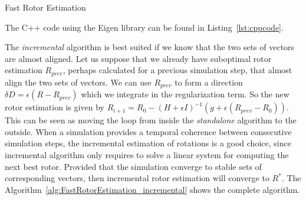 \documentclass{birkjour}
\numberwithin{equation}{section}
\begin{document}
\begin{algorithm}
\begin{algorithmic}[1]
\ENDFOR
{} 
\REPEAT
{}
\end{algorithmic}
\caption{Fast Rotor Estimation}\label{alg:FastRotorEstimation}
\end{algorithm}
The C++ code using the Eigen library can be found in Listing~\ref{lst:cppcode}.

The \emph{incremental} algorithm is best suited if we know that the two sets of vectors are almost aligned. Let us suppose that we already have suboptimal rotor estimation $R_{prev}$, perhaps calculated for a previous simulation step, that almost align the two sets of vectors. We can use $R_{prev}$ to form a direction $\delta D = \epsilon (R - R_{prev})$ which we integrate in the regularization term. So the new rotor estimation is given by $R_{i+1} = R_0 - (H + \epsilon I)^{-1} (g + \epsilon (R_{prev} - R_0))$. This can be seen as moving the loop from inside the \emph{standalone} algorithm to the outside. When a simulation provides a temporal coherence between consecutive simulation steps, the incremental estimation of rotations is a good choice, since incremental algorithm only requires to solve a linear system for computing the next best rotor. Provided that the simulation converge to stable sets of corresponding vectors, then incremental rotor estimation will converge to $R^*$. The Algorithm~\ref{alg:FastRotorEstimation_incremental} shows the complete algorithm.
\end{document}
